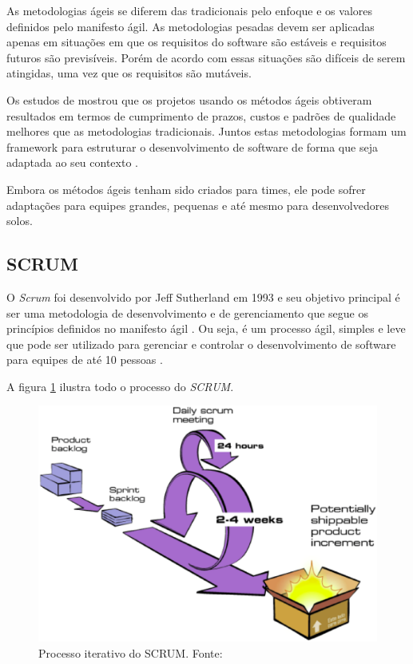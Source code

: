 As metodologias ágeis se diferem das tradicionais pelo enfoque e os valores definidos pelo manifesto ágil. As metodologias pesadas devem ser aplicadas apenas em situações em que os requisitos do software são estáveis e requisitos futuros são previsíveis. Porém de acordo com \cite{soares} essas situações são difíceis de serem atingidas, uma vez que os requisitos são mutáveis.

Os estudos de \cite{charette} mostrou que os projetos usando os métodos ágeis obtiveram resultados em termos de cumprimento de prazos, custos e padrões de qualidade melhores que as metodologias tradicionais. Juntos estas metodologias formam um framework para estruturar o desenvolvimento de software de forma que seja adaptada ao seu contexto \cite{soares}.

Embora os métodos ágeis tenham sido criados para times, ele pode sofrer adaptações para equipes grandes, pequenas e até mesmo para desenvolvedores solos. \cite{soares}

\subsection{SCRUM}

O \textit{Scrum} foi desenvolvido por Jeff Sutherland em 1993 e seu objetivo principal é ser uma metodologia de desenvolvimento e de gerenciamento que segue os princípios definidos no manifesto ágil \cite{lima}. Ou seja, é um processo ágil, simples e leve que pode ser utilizado para gerenciar e controlar o desenvolvimento de software para equipes de até 10 pessoas \cite{diniz}.

A figura \ref{fig:scrum} ilustra todo o processo do \textit{SCRUM}.

\begin{figure}[h!]
	\centering
  \includegraphics[keepaspectratio=true,scale=0.6]{figuras/scrum.eps}
  \caption[Processo iterativo do SCRUM.]{Processo iterativo do SCRUM. Fonte: \cite{diniz}}
	\label{fig:scrum}
\end{figure}

